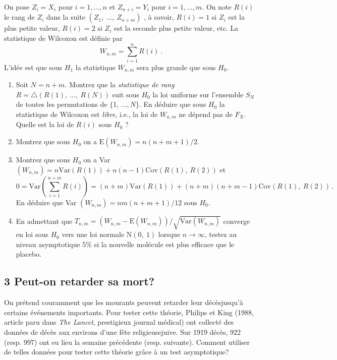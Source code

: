 \documentclass[a4paper,10pt]{article}
\begin{document}
On pose $Z_{i}=X_{i}$ pour $i=1, \ldots, n$ et $Z_{n+i}=Y_{i}$ pour $i=1, \ldots, m$. On note $R(i)$ le rang de $Z_{i}$ dans la suite $(Z_{1},\ \ldots,\ Z_{n+m})$ , \`{a} savoir, $R(i)=1$ si $Z_{i}$ est la plus petite valeur, $R(i)=2$ si $Z_{i}$ est la seconde plus petite valeur, etc. La statistique de Wilcoxon est d\'{e}finie par
$$
W_{n,m}=\sum_{i=1}^{n}R(i)\ .
$$
L'id\'{e}e est que sous $H_{1}$ la statistique $W_{n,m}$ sera plus grande que sous $H_{0}.$
\begin{enumerate}
 \item Soit $N=n+m$. Montrez que la {\it statistique de rang} $R=\triangle(R(1),\ \ldots,\ R(N))$ suit sous $H_{0}$ la loi uniforme sur l'ensemble $S_{N}$ de toutes les permutations de $\{$1, $\ldots, N\}$. En d\'{e}duire que sous $H_{0}$ la statistique de Wilcoxon est {\it libre}, i.e., la loi de $W_{n,m}$ ne d\'{e}pend pas de $F_{X}$. Quelle est la loi de $R(i)$ sous $H_{0}$ ?
\item Montrez que sous $H_{0}$ on a $\mathrm{E}(W_{n,m})=n(n+m+1)/2.$

\item Montrez que sous $H_{0}$ on a Var $(W_{n,m})=n\mathrm{Var}(R(1))+n(n-1)\mathrm{Cov}(R(1),\ R(2))$ et
$$
0= \mathrm{Var}(\displaystyle \sum_{i=1}^{n+m}R(i))=(n+m) \mathrm{Var}(R(1))+(n+m)(n+m-1)\mathrm{Cov}(R(1),\ R(2)) \, .
$$
En d\'{e}duire que Var $(W_{n,m})=nm(n+m+1)/12$ sous $H_{0}.$

\item En admettant que $T_{n,m}=(W_{n,m}-\mathrm{E}(W_{n,m}))/\sqrt{\mathrm{Var}(W_{n,m})}$ converge en loi sous $H_{0}$ vers une loi normale $\mathrm{N}(0,\ 1)$ lorsque $ n\rightarrow\infty$, testez au niveau asymptotique 5\% si la nouvelle mol\'{e}cule est plus efficace que le placebo.
\end{enumerate}

\subsection*{3 Peut-on retarder sa mort?}

On pr\'{e}tend couramment que les mourants peuvent retarder leur d\'{e}c\`{e}sjusqu'\`{a} certains \'{e}v\'{e}nements importants. Pour tester cette th\'{e}orie, Philips et King (1988, article paru dans {\it The Lancet},
prestigieux journal m\'{e}dical) ont collect\'{e} des donn\'{e}es de d\'{e}c\`{e}s aux environs d'une f\^{e}te religieusejuive. 
Sur 1919 d\'{e}c\`{e}s, 922 (resp. 997) ont eu lieu la semaine pr\'{e}c\'{e}dente (resp. suivante).
Comment utiliser de telles donn\'{e}es pour tester cette th\'{e}orie gr\^{a}ce \`{a} un test asymptotique?
\end{document}

